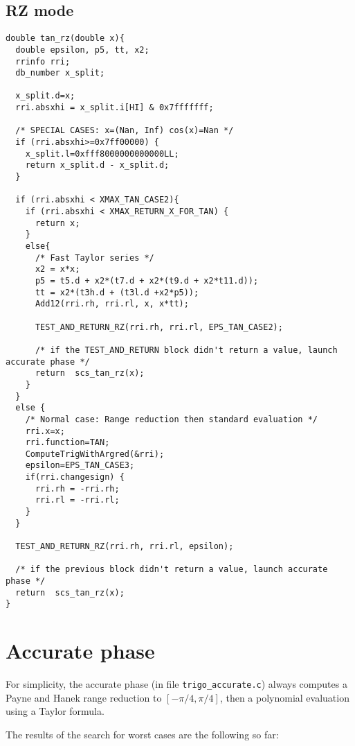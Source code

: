 \subsection{RZ mode}
\begin{lstlisting}[caption={Exceptional cases for tangent RZ},firstnumber=1]
double tan_rz(double x){
  double epsilon, p5, tt, x2;
  rrinfo rri;
  db_number x_split;

  x_split.d=x;
  rri.absxhi = x_split.i[HI] & 0x7fffffff;

  /* SPECIAL CASES: x=(Nan, Inf) cos(x)=Nan */
  if (rri.absxhi>=0x7ff00000) {
    x_split.l=0xfff8000000000000LL;
    return x_split.d - x_split.d;
  }

  if (rri.absxhi < XMAX_TAN_CASE2){
    if (rri.absxhi < XMAX_RETURN_X_FOR_TAN) {
      return x;
    }
    else{
      /* Fast Taylor series */
      x2 = x*x;
      p5 = t5.d + x2*(t7.d + x2*(t9.d + x2*t11.d));
      tt = x2*(t3h.d + (t3l.d +x2*p5));
      Add12(rri.rh, rri.rl, x, x*tt);

      TEST_AND_RETURN_RZ(rri.rh, rri.rl, EPS_TAN_CASE2);

      /* if the TEST_AND_RETURN block didn't return a value, launch accurate phase */
      return  scs_tan_rz(x);
    }
  }
  else {
    /* Normal case: Range reduction then standard evaluation */
    rri.x=x;
    rri.function=TAN;
    ComputeTrigWithArgred(&rri);
    epsilon=EPS_TAN_CASE3;
    if(rri.changesign) {
      rri.rh = -rri.rh;
      rri.rl = -rri.rl;
    }
  }

  TEST_AND_RETURN_RZ(rri.rh, rri.rl, epsilon);

  /* if the previous block didn't return a value, launch accurate phase */
  return  scs_tan_rz(x);
}
\end{lstlisting}




\section{Accurate phase}

For simplicity, the accurate phase (in file \texttt{trigo\_accurate.c}) always
computes a Payne and Hanek range reduction to $[-\pi/4, \pi/4]$,
then a polynomial evaluation using a Taylor formula.

The results of the search for worst cases are the following so far:

